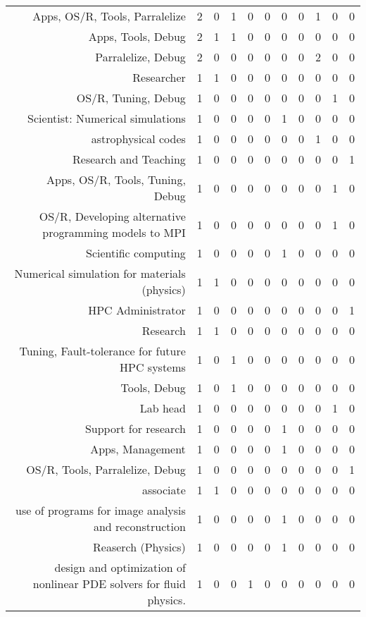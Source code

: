 {\begin{landscape}
\begin{longtable}[htb]{r|c|c|c|c|c|c|c|c|c|c}
{Apps, OS/R, Tools, Parralelize} & 2 & 0 & 1 & 0 & 0 & 0 & 0 & 1 & 0 & 0 \\%
{Apps, Tools, Debug} & 2 & 1 & 1 & 0 & 0 & 0 & 0 & 0 & 0 & 0 \\%
{Parralelize, Debug} & 2 & 0 & 0 & 0 & 0 & 0 & 0 & 2 & 0 & 0 \\%
{Researcher} & 1 & 1 & 0 & 0 & 0 & 0 & 0 & 0 & 0 & 0 \\%
{OS/R, Tuning, Debug} & 1 & 0 & 0 & 0 & 0 & 0 & 0 & 0 & 1 & 0 \\%
{Scientist: Numerical simulations} & 1 & 0 & 0 & 0 & 0 & 1 & 0 & 0 & 0 & 0 \\%
{astrophysical codes} & 1 & 0 & 0 & 0 & 0 & 0 & 0 & 1 & 0 & 0 \\%
{Research and Teaching} & 1 & 0 & 0 & 0 & 0 & 0 & 0 & 0 & 0 & 1 \\%
{Apps, OS/R, Tools, Tuning, Debug} & 1 & 0 & 0 & 0 & 0 & 0 & 0 & 0 & 1 & 0 \\%
{OS/R, Developing alternative programming models to MPI} & 1 & 0 & 0 & 0 & 0 & 0 & 0 & 0 & 1 & 0 \\%
{Scientific computing} & 1 & 0 & 0 & 0 & 0 & 1 & 0 & 0 & 0 & 0 \\%
{Numerical simulation for materials (physics)} & 1 & 1 & 0 & 0 & 0 & 0 & 0 & 0 & 0 & 0 \\%
{HPC Administrator} & 1 & 0 & 0 & 0 & 0 & 0 & 0 & 0 & 0 & 1 \\%
{Research} & 1 & 1 & 0 & 0 & 0 & 0 & 0 & 0 & 0 & 0 \\%
{Tuning, Fault-tolerance for future HPC systems} & 1 & 0 & 1 & 0 & 0 & 0 & 0 & 0 & 0 & 0 \\%
{Tools, Debug} & 1 & 0 & 1 & 0 & 0 & 0 & 0 & 0 & 0 & 0 \\%
{Lab head} & 1 & 0 & 0 & 0 & 0 & 0 & 0 & 0 & 1 & 0 \\%
{Support for research} & 1 & 0 & 0 & 0 & 0 & 1 & 0 & 0 & 0 & 0 \\%
{Apps, Management} & 1 & 0 & 0 & 0 & 0 & 1 & 0 & 0 & 0 & 0 \\%
{OS/R, Tools, Parralelize, Debug} & 1 & 0 & 0 & 0 & 0 & 0 & 0 & 0 & 0 & 1 \\%
{associate} & 1 & 1 & 0 & 0 & 0 & 0 & 0 & 0 & 0 & 0 \\%
{use of programs for image analysis and reconstruction} & 1 & 0 & 0 & 0 & 0 & 1 & 0 & 0 & 0 & 0 \\%
{Reaserch (Physics)} & 1 & 0 & 0 & 0 & 0 & 1 & 0 & 0 & 0 & 0 \\%
{design and optimization of nonlinear PDE solvers for fluid physics.} & 1 & 0 & 0 & 1 & 0 & 0 & 0 & 0 & 0 & 0 \\%

\end{longtable}
\end{landscape}}
